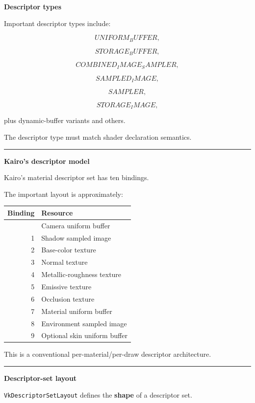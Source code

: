 \textbf{Descriptor types}

Important descriptor types include:

\[
UNIFORM_BUFFER,
\]

\[
STORAGE_BUFFER,
\]

\[
COMBINED_IMAGE_SAMPLER,
\]

\[
SAMPLED_IMAGE,
\]

\[
SAMPLER,
\]

\[
STORAGE_IMAGE,
\]

plus dynamic-buffer variants and others.

The descriptor type must match shader declaration semantics.

\begin{center}\rule{0.5\linewidth}{0.5pt}\end{center}

\textbf{Kairo's descriptor model}

Kairo's material descriptor set has ten bindings.

The important layout is approximately:

{\def\LTcaptype{none} %
\begin{longtable}[]{@{}rl@{}}
\toprule\noalign{}
Binding & Resource \\
\midrule\noalign{}
\endhead
\bottomrule\noalign{}
\endlastfoot
0 & Camera uniform buffer \\
1 & Shadow sampled image \\
2 & Base-color texture \\
3 & Normal texture \\
4 & Metallic-roughness texture \\
5 & Emissive texture \\
6 & Occlusion texture \\
7 & Material uniform buffer \\
8 & Environment sampled image \\
9 & Optional skin uniform buffer \\
\end{longtable}
}

This is a conventional per-material/per-draw descriptor architecture.

\begin{center}\rule{0.5\linewidth}{0.5pt}\end{center}

\textbf{Descriptor-set layout}

\texttt{VkDescriptorSetLayout} defines the \textbf{shape} of a descriptor set.

